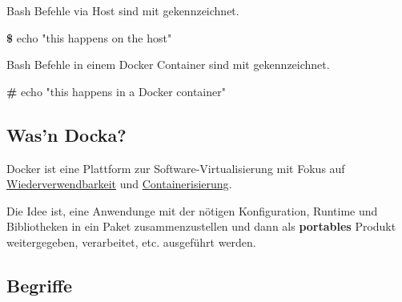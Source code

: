 \documentclass[
  10pt,
  a4paper,
  twocolumn]{article}
\newenvironment{Shaded}{}{}
\newcommand{\ExtensionTok}[1]{\textcolor[rgb]{0.84,0.23,0.29}{\textbf{#1}}}
\newcommand{\NormalTok}[1]{\textcolor[rgb]{0.14,0.16,0.18}{#1}}
\newcommand{\StringTok}[1]{\textcolor[rgb]{0.01,0.18,0.38}{#1}}
\begin{document}
\begin{tcolorbox}[enhanced jigsaw, toprule=.15mm, opacityback=0, colbacktitle=quarto-callout-important-color!10!white, breakable, colframe=quarto-callout-important-color-frame, title=\textcolor{quarto-callout-important-color}{\faExclamation}\hspace{0.5em}{Wichtig}, left=2mm, arc=.35mm, toptitle=1mm, bottomrule=.15mm, rightrule=.15mm, titlerule=0mm, bottomtitle=1mm, leftrule=.75mm, opacitybacktitle=0.6, coltitle=black, colback=white]

Bash Befehle via Host sind mit {\color{BrickRed}{\texttt{\textbf{\$}}}}
gekennzeichnet.

\begin{Shaded}
\begin{Highlighting}[]
\ExtensionTok{\$}\NormalTok{ echo }\StringTok{"this happens on the host"}
\end{Highlighting}
\end{Shaded}

Bash Befehle in einem Docker Container sind mit
{\color{BrickRed}{\texttt{\textbf{\#}}}} gekennzeichnet.

\begin{Shaded}
\begin{Highlighting}[]
\ExtensionTok{\#}\NormalTok{ echo }\StringTok{"this happens in a Docker container"}
\end{Highlighting}
\end{Shaded}

\end{tcolorbox}

\subsection{Was'n Docka?}\label{wasn-docka}

Docker ist eine Plattform zur Software-Virtualisierung mit Fokus auf
\ul{Wiederverwendbarkeit} und \ul{Containerisierung}.

Die Idee ist, eine Anwendunge mit der nötigen Konfiguration, Runtime und
Bibliotheken in ein Paket zusammenzustellen und dann als
\textbf{portables} Produkt weitergegeben, verarbeitet, etc. ausgeführt
werden.

\subsection{Begriffe}\label{begriffe}
\end{document}
